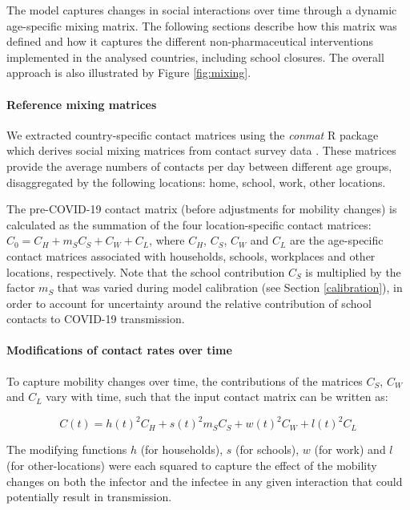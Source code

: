 The model captures changes in social interactions over time through a dynamic age-specific mixing matrix. The following
sections describe how this matrix was defined and how it captures the different non-pharmaceutical interventions implemented
in the analysed countries, including school closures. The overall approach is also illustrated by Figure \ref{fig:mixing}.

\paragraph{Reference mixing matrices}
We extracted country-specific contact matrices using the \textit{conmat} R package which derives social mixing matrices from 
contact survey data \cite{conmat2024,mossong-2008}. These matrices provide the average numbers of contacts per day between different age groups, disaggregated by the following 
locations: home, school, work, other locations. 

The pre-COVID-19 contact matrix (before adjustments for mobility changes) is calculated as the summation of the four location-specific 
contact matrices: \(C_{0} = C_{H} + m_S C_{S} + C_{W} + C_{L}\), where \(C_{H}\), \(C_{S}\), \(C_{W}\) and \(C_{L}\) are the age-specific
contact matrices associated with households, schools, workplaces and other locations, respectively. Note that the school contribution $C_{S}$ is 
multiplied by the factor $m_S$ that was varied during model calibration (see Section \ref{calibration}), in order to account for uncertainty around 
the relative contribution of school contacts to COVID-19 transmission.

\paragraph{Modifications of contact rates over time}
\label{time_var_mixing}
To capture mobility changes over time, the contributions of the matrices \(C_{S}\), \(C_{W}\) and \(C_{L}\) vary with time, such that the input contact matrix can be written as:

\begin{equation}
\label{eq_mixing}
  C(t)= h(t)^{2}C_{H}+ s(t)^{2} m_S C_{S}+ w(t)^{2}C_{W}+l(t)^{2}C_{L}
\end{equation}

The modifying functions $h$ (for households), $s$ (for schools), $w$ (for work) and $l$ (for other-locations) were each squared to capture the effect of the mobility changes on 
both the infector and the infectee in any given interaction that could potentially result in transmission. 

